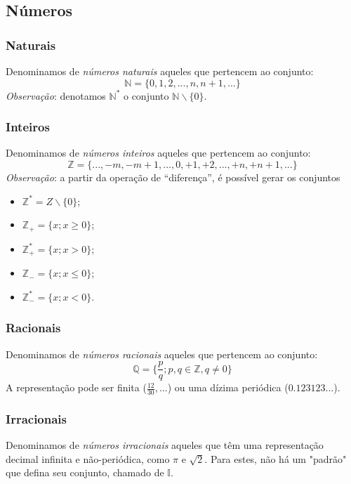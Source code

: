 \documentclass[13pt,letterpaper]{article}
\begin{document}
\subsection{Números}
\subsubsection{Naturais}
Denominamos de \emph{números naturais} aqueles que pertencem ao conjunto:
\begin{displaymath}
    \mathbb{N} = \{0, 1, 2, ..., n, n + 1, ...\}
\end{displaymath}
\emph{Observação}: denotamos $\mathbb{N}^*$ o conjunto $\mathbb{N} \backslash \{0\}$.

\subsubsection{Inteiros}
Denominamos de \emph{números inteiros} aqueles que pertencem ao conjunto:
\begin{displaymath}
    \mathbb{Z} = \{..., -m, -m + 1, ..., 0, +1, +2, ..., +n, +n + 1, ...\}
\end{displaymath}
\emph{Observação}: a partir da operação de \enquote{diferença}, é possível gerar os conjuntos
\begin{itemize}
    \item $\mathbb{Z}^* = Z \backslash \{0\}$;
    \item $\mathbb{Z}_+ = \{ x; x \ge 0 \}$;
    \item $\mathbb{Z}^*_+ = \{ x; x > 0 \}$;
    \item $\mathbb{Z}_- = \{ x; x \leq 0 \}$;
    \item $\mathbb{Z}^*_- = \{ x; x < 0 \}$.
\end{itemize}

\subsubsection{Racionais}
Denominamos de \emph{números racionais} aqueles que pertencem ao conjunto:
\begin{displaymath}
    \mathbb{Q} = \{\frac{p}{q} ; p, q \in \mathbb{Z}, q \ne 0 \}
\end{displaymath}
A representação pode ser finita ($\frac{12}{30},...$) ou uma dízima periódica 
($0.123123...$).

\subsubsection{Irracionais}
Denominamos de \emph{números irracionais} aqueles que têm uma representação decimal infinita e não-periódica, como $\pi$ e $\sqrt{2}$. Para estes, não há um "padrão" que defina seu conjunto, chamado de $\mathbb{I}$.
\end{document}
